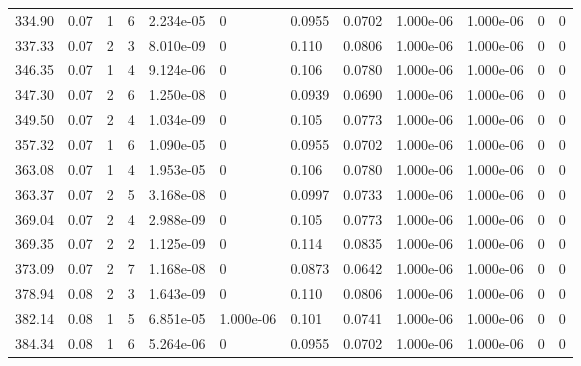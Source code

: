 \documentclass[preview]{standalone}
\begin{document}
{{{\begin{tabular}{L{1.2cm}C{1.2cm} C{0.3cm}C{0.5cm} C{1.4cm}C{1.4cm} C{1.4cm}C{1.4cm} C{1.6cm}C{1.6cm} C{1.6cm}C{1.6cm}}
  334.90  &  0.07  & 1     &  6 &  2.234e-05  & 0  &  0.0955&   0.0702& 1.000e-06 & 1.000e-06   &  0 & 0  \\ 
  337.33  &  0.07  & 2     &  3 &  8.010e-09  & 0  &  0.110&   0.0806& 1.000e-06 & 1.000e-06   &  0 & 0  \\ 
  346.35  &  0.07  & 1     &  4 &  9.124e-06  & 0  &  0.106&   0.0780& 1.000e-06 & 1.000e-06   &  0 & 0  \\ 
  347.30  &  0.07  & 2     &  6 &  1.250e-08  & 0  &  0.0939&   0.0690& 1.000e-06 & 1.000e-06   &  0 & 0  \\ 
  349.50  &  0.07  & 2     &  4 &  1.034e-09  & 0  &  0.105&   0.0773& 1.000e-06 & 1.000e-06   &  0 & 0  \\ 
  357.32  &  0.07  & 1     &  6 &  1.090e-05  & 0  &  0.0955&   0.0702& 1.000e-06 & 1.000e-06   &  0 & 0  \\ 
  363.08  &  0.07  & 1     &  4 &  1.953e-05  & 0  &  0.106&   0.0780& 1.000e-06 & 1.000e-06   &  0 & 0  \\ 
  363.37  &  0.07  & 2     &  5 &  3.168e-08  & 0  &  0.0997&   0.0733& 1.000e-06 & 1.000e-06   &  0 & 0  \\ 
  369.04  &  0.07  & 2     &  4 &  2.988e-09  & 0  &  0.105&   0.0773& 1.000e-06 & 1.000e-06   &  0 & 0  \\ 
  369.35  &  0.07  & 2     &  2 &  1.125e-09  & 0  &  0.114&   0.0835& 1.000e-06 & 1.000e-06   &  0 & 0  \\ 
  373.09  &  0.07  & 2     &  7 &  1.168e-08  & 0  &  0.0873&   0.0642& 1.000e-06 & 1.000e-06   &  0 & 0  \\ 
  378.94  &  0.08  & 2     &  3 &  1.643e-09  & 0  &  0.110&   0.0806& 1.000e-06 & 1.000e-06   &  0 & 0  \\ 
  382.14  &  0.08  & 1     &  5 &  6.851e-05  & 1.000e-06  &  0.101&   0.0741& 1.000e-06 & 1.000e-06   &  0 & 0  \\ 
  384.34  &  0.08  & 1     &  6 &  5.264e-06  & 0  &  0.0955&   0.0702& 1.000e-06 & 1.000e-06   &  0 & 0  \\ 
\hline 
\end{tabular} 

}}}
\end{document}
